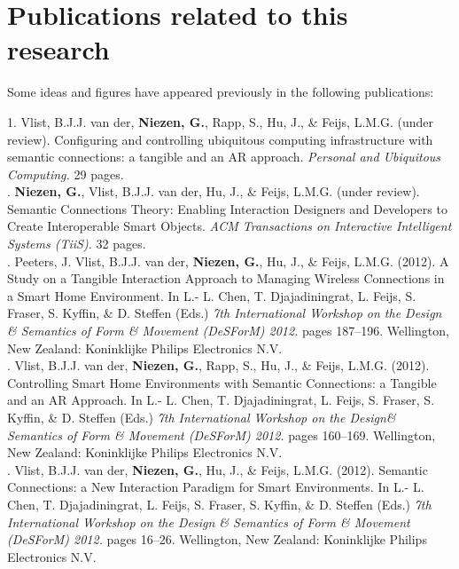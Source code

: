 \cleardoublepage
\pagestyle{empty}

\chapter*{Publications related to this research}

Some ideas and figures have appeared previously in the following publications:

\bigskip

1. Vlist, B.J.J. van der, \textbf{Niezen, G.}, Rapp, S., Hu, J., \& Feijs, L.M.G.  (under review). Configuring and controlling ubiquitous computing infrastructure with semantic connections: a tangible and an AR approach. \emph{Personal and Ubiquitous Computing.} 29 pages. \\

. \textbf{Niezen, G.}, Vlist, B.J.J. van der, Hu, J., \& Feijs, L.M.G.  (under review). Semantic Connections Theory: Enabling Interaction Designers and Developers to Create Interoperable Smart Objects. \emph{ACM Transactions on Interactive Intelligent Systems (TiiS).} 32 pages. \\

. Peeters, J. Vlist, B.J.J. van der, \textbf{Niezen, G.}, Hu, J., \& Feijs, L.M.G. (2012). A Study on a Tangible Interaction Approach to Managing Wireless Connections in a Smart Home Environment.  In L.- L. Chen, T. Djajadiningrat, L. Feijs, S. Fraser, S. Kyffin, \&  D. Steffen (Eds.) \emph{7th International Workshop on the Design \& Semantics of Form \& Movement (DeSForM) 2012.} pages 187--196. Wellington, New Zealand: Koninklijke Philips Electronics N.V.\\

. Vlist, B.J.J. van der, \textbf{Niezen, G.}, Rapp, S., Hu, J., \& Feijs, L.M.G. (2012). Controlling Smart Home Environments with Semantic Connections: a Tangible and an AR Approach. In L.- L. Chen, T. Djajadiningrat, L. Feijs, S. Fraser, S. Kyffin, \&  D. Steffen (Eds.) \emph{7th International Workshop on the Design\& Semantics of Form \& Movement (DeSForM) 2012.} pages 160--169.  Wellington, New Zealand: Koninklijke Philips Electronics N.V.\\

. Vlist, B.J.J. van der, \textbf{Niezen, G.}, Hu, J., \& Feijs, L.M.G. (2012). Semantic Connections: a New Interaction Paradigm for Smart Environments. In L.- L. Chen, T. Djajadiningrat, L. Feijs, S. Fraser, S. Kyffin, \&  D. Steffen (Eds.) \emph{7th International Workshop on the Design \& Semantics of Form \& Movement (DeSForM) 2012.} pages 16--26. Wellington, New Zealand: Koninklijke Philips Electronics N.V.\\

